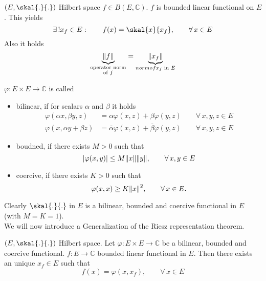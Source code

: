 \begin{theorem}
	$(E, \skal{.}{.})$ Hilbert space $f \in B(E,\mathbb{C})$. $f$ is bounded linear functional on $E$. This yields
	\[
		\exists\,! x_f \in E: \qquad f(x) = \skal{x}{x_f}, \qquad \forall\, x \in E
	\]
	Also it holds
	\[
		\underset{\substack{\text{operator norm} \\ \text{of $f$}}}{\underbrace{\norm{f}}} = \underset{\substack{norm of} \\ \text{$x_f$ in $E$}}{\underbrace{\norm{x_f}}}
	\]
\end{theorem}

\begin{definition}
	$\varphi: E \times E \to \mathbb{C}$ is called
	\begin{itemize}
		\item bilinear, if for scalars $\alpha$ and $\beta$ it holds
		\begin{align*}
			\varphi( \alpha x, \beta y,z) &= \alpha \varphi(x,z)+ \beta \varphi(y,z) \qquad \forall\, x,y,z \in E \\
			\varphi(x,\alpha y + \beta z) &= \bar{\alpha} \varphi(x,z) + \overline{\beta} \varphi(y,z) \qquad \forall\, x,y,z \in E
		\end{align*}
		\item boudned, if there exists $M>0$ such that
		\[
			\abs{\varphi(x,y)} \leq M \norm{x}\norm{y}, \qquad \forall\, x,y \in E
		\]
		\item coercive, if there exists $K>0$ such that
		\[
			\varphi(x,x) \geq K \norm{x}^2, \qquad \forall\, x \in E.
		\]
	\end{itemize}
\end{definition}
Clearly $\skal{.}{.}$ in $E$ is a bilinear, bounded and coercive functional in $E$ (with $M=K=1$). \\
We will now introduce a Generalization of the Riesz representation theorem.

\begin{theorem}
	$(E, \skal{.}{.})$ Hilbert space. Let $\varphi: E \times E \to \mathbb{C}$ be a bilinear, bounded and coercive functional. $f: E \to \mathbb{C}$ bounded linear functional in $E$. Then there exists an unique $x_f \in E$ such that
	\[
		f(x) = \varphi(x,x_f), \qquad  \forall\, x \in E
	\]
\end{theorem}

